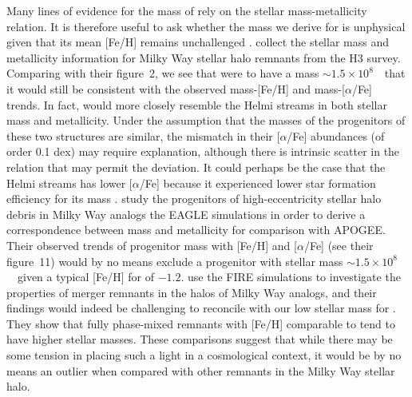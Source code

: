 Many lines of evidence for the mass of \gse rely on the stellar mass-metallicity relation. It is therefore useful to ask whether the mass we derive for \gse is unphysical given that its mean [Fe/H] remains unchallenged \parencite[cf. our Figure~\ref{ch3:fig:selection_abundances} with ][]{myeong19,monty20,hasselquist21,horta23a}. \textcite{naidu22} collect the stellar mass and metallicity information for Milky Way stellar halo remnants from the H3 survey. Comparing with their figure~2, we see that were \gse to have a mass $\sim 1.5\times10^{8}$~\Msun\ that it would still be consistent with the observed mass-[Fe/H] and mass-[$\alpha$/Fe] trends. In fact, \gse would more closely resemble the Helmi streams \parencite{helmi99} in both stellar mass and metallicity. Under the assumption that the masses of the progenitors of these two structures are similar, the mismatch in their [$\alpha$/Fe] abundances (of order 0.1 dex) may require explanation, although there is intrinsic scatter in the relation that may permit the deviation. It could perhaps be the case that the Helmi streams has lower [$\alpha$/Fe] because it experienced lower star formation efficiency for its mass \parencite[e.g.][]{matsuno22}. \textcite{mackereth19a} study the progenitors of high-eccentricity stellar halo debris in Milky Way analogs the EAGLE simulations in order to derive a correspondence between mass and metallicity for comparison with APOGEE. Their observed trends of progenitor mass with [Fe/H] and [$\alpha$/Fe] (see their figure~11) would by no means exclude a progenitor with stellar mass $\sim 1.5\times10^{8}$~\Msun\ given a typical [Fe/H] for \gse of $-1.2$. \textcite{horta23b} use the FIRE simulations to investigate the properties of merger remnants in the halos of Milky Way analogs, and their findings would indeed be challenging to reconcile with our low stellar mass for \gse. They show that fully phase-mixed remnants with [Fe/H] comparable to \gse tend to have higher stellar masses. These comparisons suggest that while there may be some tension in placing such a light \gse in a cosmological context, it would be by no means an outlier when compared with other remnants in the Milky Way stellar halo.

